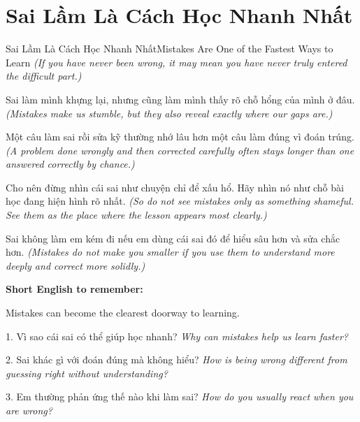 \section{Sai Lầm Là Cách Học Nhanh Nhất}
\begin{truyen}{Sai Lầm Là Cách Học Nhanh Nhất}{Mistakes Are One of the Fastest Ways to Learn}
\textit{(If you have never been wrong, it may mean you have never truly entered the difficult part.)}

Sai làm mình khựng lại, nhưng cũng làm mình thấy rõ chỗ hổng của mình ở đâu.
\textit{(Mistakes make us stumble, but they also reveal exactly where our gaps are.)}

Một câu làm sai rồi sửa kỹ thường nhớ lâu hơn một câu làm đúng vì đoán trúng.
\textit{(A problem done wrongly and then corrected carefully often stays longer than one answered correctly by chance.)}

Cho nên đừng nhìn cái sai như chuyện chỉ để xấu hổ. Hãy nhìn nó như chỗ bài học đang hiện hình rõ nhất.
\textit{(So do not see mistakes only as something shameful. See them as the place where the lesson appears most clearly.)}
\end{truyen}

\begin{baihoc}
Sai không làm em kém đi nếu em dùng cái sai đó để hiểu sâu hơn và sửa chắc hơn.
\textit{(Mistakes do not make you smaller if you use them to understand more deeply and correct more solidly.)}
\end{baihoc}

\begin{ghinhoanh}
\textbf{Short English to remember:}

Mistakes can become the clearest doorway to learning.

\end{ghinhoanh}

\begin{tuhocnhanh}
1. Vì sao cái sai có thể giúp học nhanh? \textit{Why can mistakes help us learn faster?}

2. Sai khác gì với đoán đúng mà không hiểu? \textit{How is being wrong different from guessing right without understanding?}

3. Em thường phản ứng thế nào khi làm sai? \textit{How do you usually react when you are wrong?}
\end{tuhocnhanh}
\ngancach

